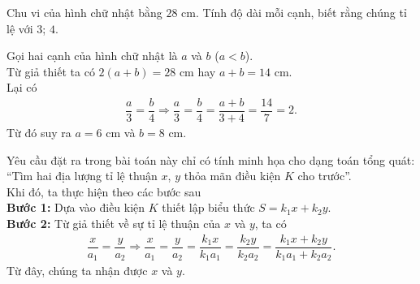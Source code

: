 \begin{vd}%
 Chu vi của hình chữ nhật bằng $28$ cm. Tính độ dài mỗi cạnh, biết rằng chúng tỉ lệ với $3$; $4$.
 \loigiai
  {
  Gọi hai cạnh của hình chữ nhật là $a$ và $b$ ($a<b$).\\
  Từ giả thiết ta có $2(a+b)=28$ cm hay $a+b=14$ cm.\\
  Lại có
  \begin{eqnarray*}
   \dfrac{a}{3} = \dfrac{b}{4} \Rightarrow \dfrac{a}{3}=\dfrac{b}{4}=\dfrac{a+b}{3+4}= \dfrac{14}{7} = 2.
  \end{eqnarray*}
  Từ đó suy ra $a=6$ cm và $b=8$ cm.
  \begin{note}
   Yêu cầu đặt ra trong bài toán này chỉ có tính minh họa cho dạng toán tổng quát: ``Tìm hai địa lượng tỉ lệ thuận $x$, $y$ thỏa mãn điều kiện $K$ cho trước''.\\
   Khi đó, ta thực hiện theo các bước sau\\
   {\bf Bước 1:} Dựa vào điều kiện $K$ thiết lập biểu thức $S=k_1x+k_2y$.\\
   {\bf Bước 2:} Từ giả thiết về sự tỉ lệ thuận của $x$ và $y$, ta có
   \begin{eqnarray*}
    \dfrac{x}{a_1}=\dfrac{y}{a_2} \Rightarrow \dfrac{x}{a_1}=\dfrac{y}{a_2}=\dfrac{k_1x}{k_1a_1} = \dfrac{k_2y}{k_2a_2} = \dfrac{k_1x+k_2y}{k_1a_1+k_2a_2}.
   \end{eqnarray*}
   Từ đây, chúng ta nhận được $x$ và $y$.
  \end{note}
  }
\end{vd}

